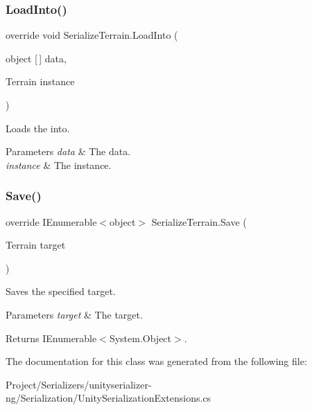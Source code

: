 \subsubsection{\texorpdfstring{Load\+Into()}{LoadInto()}}
{\footnotesize\ttfamily override void Serialize\+Terrain.\+Load\+Into (\begin{DoxyParamCaption}\item[{object \mbox{[}$\,$\mbox{]}}]{data,  }\item[{Terrain}]{instance }\end{DoxyParamCaption})\hspace{0.3cm}{\ttfamily [inline]}}



Loads the into. 


\begin{DoxyParams}{Parameters}
{\em data} & The data.\\
\hline
{\em instance} & The instance.\\
\hline
\end{DoxyParams}
\mbox{\label{class_serialize_terrain_aab7a541af72244820a5b2231dec7a4dd}} 
\subsubsection{\texorpdfstring{Save()}{Save()}}
{\footnotesize\ttfamily override I\+Enumerable$<$object$>$ Serialize\+Terrain.\+Save (\begin{DoxyParamCaption}\item[{Terrain}]{target }\end{DoxyParamCaption})\hspace{0.3cm}{\ttfamily [inline]}}



Saves the specified target. 


\begin{DoxyParams}{Parameters}
{\em target} & The target.\\
\hline
\end{DoxyParams}
\begin{DoxyReturn}{Returns}
I\+Enumerable$<$System.\+Object$>$.
\end{DoxyReturn}


The documentation for this class was generated from the following file\+:\begin{DoxyCompactItemize}
\item 
Project/\+Serializers/unityserializer-\/ng/\+Serialization/Unity\+Serialization\+Extensions.\+cs\end{DoxyCompactItemize}
